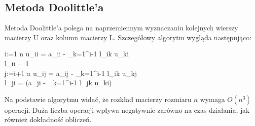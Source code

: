 \documentclass[11pt]{article}
\begin{document}
\subsection{Metoda Doolittle’a}
Metoda Doolittle’a polega na naprzemiennym wyznaczaniu kolejnych wierszy macierzy U oraz kolumn macierzy L. Szczegółowy algorytm wygląda następująco:
\begin{program}
  \FOR i:=1 \TO n \DO
	u_{ii} = a_{ii} - \sum_{k=1}^{i-1} l_{ik} u_{ki}\\
	l_{ii} = 1\\
	\FOR j:=i+1 \TO n \DO
		u_{ij} = a_{ij} - \sum_{k=1}^{i-1} l_{ik} u_{kj}\\
		l_{ji} =  (a_{ji} - \sum_{k=1}^{i-1} l_{jk} u_{ki})\\
\end{program}
Na podstawie algorytmu widać, że rozkład macierzy rozmiaru $n$ wymaga $O(n^{3})$ operacji. Duża liczba operacji wpływa negatywnie zarówno na czas działania, jak również dokładność obliczeń. 
\end{document}
